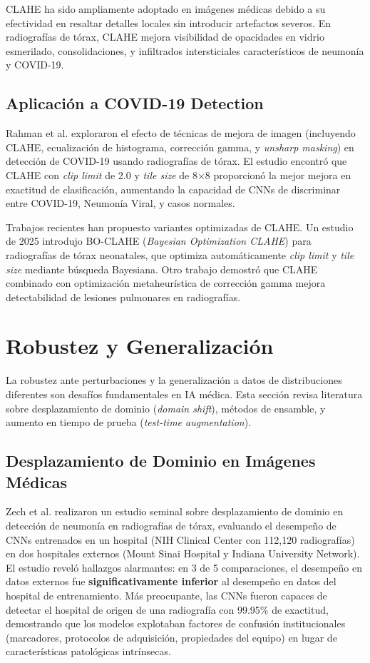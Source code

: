 CLAHE ha sido ampliamente adoptado en imágenes médicas debido a su efectividad en resaltar detalles locales sin introducir artefactos severos. En radiografías de tórax, CLAHE mejora visibilidad de opacidades en vidrio esmerilado, consolidaciones, y infiltrados intersticiales característicos de neumonía y COVID-19.

\subsection{Aplicación a COVID-19 Detection}

Rahman et al. \cite{rahman2021exploring} exploraron el efecto de técnicas de mejora de imagen (incluyendo CLAHE, ecualización de histograma, corrección gamma, y \textit{unsharp masking}) en detección de COVID-19 usando radiografías de tórax. El estudio encontró que CLAHE con \textit{clip limit} de 2.0 y \textit{tile size} de 8$\times$8 proporcionó la mejor mejora en exactitud de clasificación, aumentando la capacidad de CNNs de discriminar entre COVID-19, Neumonía Viral, y casos normales.

Trabajos recientes han propuesto variantes optimizadas de CLAHE. Un estudio de 2025 introdujo BO-CLAHE (\textit{Bayesian Optimization CLAHE}) para radiografías de tórax neonatales, que optimiza automáticamente \textit{clip limit} y \textit{tile size} mediante búsqueda Bayesiana. Otro trabajo demostró que CLAHE combinado con optimización metaheurística de corrección gamma mejora detectabilidad de lesiones pulmonares en radiografías.


\section{Robustez y Generalización}
\label{sec:robustez_generalizacion}

La robustez ante perturbaciones y la generalización a datos de distribuciones diferentes son desafíos fundamentales en IA médica. Esta sección revisa literatura sobre desplazamiento de dominio (\textit{domain shift}), métodos de ensamble, y aumento en tiempo de prueba (\textit{test-time augmentation}).

\subsection{Desplazamiento de Dominio en Imágenes Médicas}

Zech et al. \cite{zech2018variable} realizaron un estudio seminal sobre desplazamiento de dominio en detección de neumonía en radiografías de tórax, evaluando el desempeño de CNNs entrenados en un hospital (NIH Clinical Center con 112,120 radiografías) en dos hospitales externos (Mount Sinai Hospital y Indiana University Network). El estudio reveló hallazgos alarmantes: en 3 de 5 comparaciones, el desempeño en datos externos fue \textbf{significativamente inferior} al desempeño en datos del hospital de entrenamiento. Más preocupante, las CNNs fueron capaces de detectar el hospital de origen de una radiografía con 99.95\% de exactitud, demostrando que los modelos explotaban factores de confusión institucionales (marcadores, protocolos de adquisición, propiedades del equipo) en lugar de características patológicas intrínsecas.

